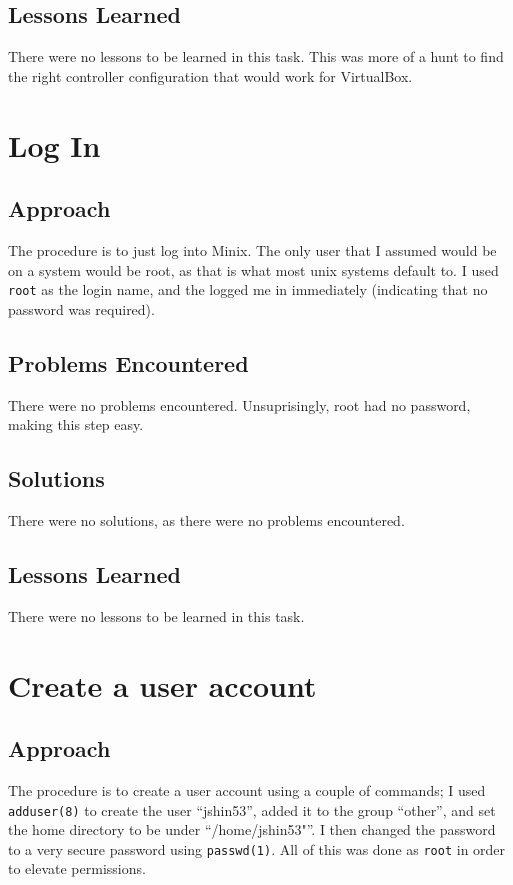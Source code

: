 \documentclass[11pt]{article}
\begin{document}
\subsection{Lessons Learned}
There were no lessons to be learned in this task. This was more of a hunt to find the right controller configuration that would work for {\sc VirtualBox}.

\section{Log In}
\subsection{Approach}
The procedure is to just log into {\sc Minix}. The only user that I assumed would be on a system would be root, as that is what most unix systems default to. I used {\tt root} as the login name, and the logged me in immediately (indicating that no password was required).

\subsection{Problems Encountered}
There were no problems encountered. Unsuprisingly, root had no password, making this step easy.

\subsection{Solutions}
There were no solutions, as there were no problems encountered.

\subsection{Lessons Learned}
There were no lessons to be learned in this task.

\section{Create a user account}
\subsection{Approach}
The procedure is to create a user account using a couple of commands; I used {\tt adduser(8)} to create the user ``jshin53'', added it to the group ``other'', and set the home directory to be under ``/home/jshin53"''. I then changed the password to a very secure password using {\tt passwd(1)}. All of this was done as {\tt root} in order to elevate permissions.
\end{document}
